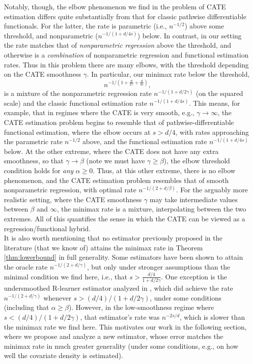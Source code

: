 \documentclass[11pt,twoside]{article}
\theoremstyle{definition}
\theoremstyle{remark}
\begin{document}
Notably, though, the elbow phenomenon we find in the problem of CATE estimation differs quite substantially from that for classic pathwise differentiable functionals. For the latter, the rate is parametric (i.e., $n^{-1/2}$) above some threshold, and nonparametric ($n^{-1/(1+d/4s)}$) below. In contrast, in our setting the rate matches that of \emph{nonparametric regression} above the threshold, and otherwise is a \emph{combination} of nonparametric regression and functional estimation rates. Thus in this problem there are many elbows, with the threshold depending on the CATE smoothness $\gamma$. In particular, our minimax rate below the threshold, 
$$ n^{-1/\left(1 + \frac{d}{2\gamma} + \frac{d}{4s} \right) }  , $$
is a mixture of the nonparametric regression rate $n^{-1/(1+d/2\gamma)}$ (on the squared scale)  and the classic functional estimation rate $n^{-1/(1+d/4s)}$. This means, for example, that in regimes where the CATE is very smooth, e.g., $\gamma \rightarrow \infty$, the CATE estimation problem begins to resemble that of pathwise-differentiable functional estimation, where the elbow occurs at $s> d/4$, with rates approaching  the parametric rate $n^{-1/2}$ above, and the functional estimation rate $n^{-1/(1+d/4s)}$ below. At the other extreme, where the CATE does not have any extra smoothness, so that $\gamma \rightarrow \beta$ (note we must have $\gamma \geq \beta$), the elbow threshold condition holds for \emph{any} $\alpha \geq 0$. Thus, at this other extreme, there is no elbow phenomenon, and the CATE estimation problem resembles that of smooth nonparametric regression, with optimal rate $n^{-1/(2+d/\beta)}$. For the arguably more realistic setting, where the CATE smoothness $\gamma$ may take intermediate values between $\beta$ and $\infty$, the minimax rate is a mixture, interpolating between the two extremes. All of this quantifies the sense in which the CATE can be viewed as a regression/functional hybrid.  \\


It is also worth mentioning that no estimator previously proposed in the literature (that we know of) attains the minimax rate in Theorem \ref{thm:lowerbound} in full generality. Some estimators have been shown to attain the oracle rate $n^{-1/(2+d/\gamma)}$, but  only under  stronger assumptions than the minimal condition we find here, i.e., that $s > \frac{d/4}{1+d/2\gamma}$. One exception is the undersmoothed R-learner estimator analyzed in \citet{kennedy2023towards}, which did achieve the rate $n^{-1/(2+d/\gamma)}$ whenever $s > (d/4)/(1+d/2\gamma)$, under some conditions (including that $\alpha \geq \beta$). However, in the low-smoothness regime where $s < (d/4)/(1+d/2\gamma)$, that estimator's rate was $n^{-2s/d}$, which is slower than the minimax rate we find here. This motivates our work in the following section, where we propose and analyze a new estimator, whose error matches the minimax rate in much greater generality (under some conditions, e.g., on how well the covariate density is estimated). \\
\end{document}
